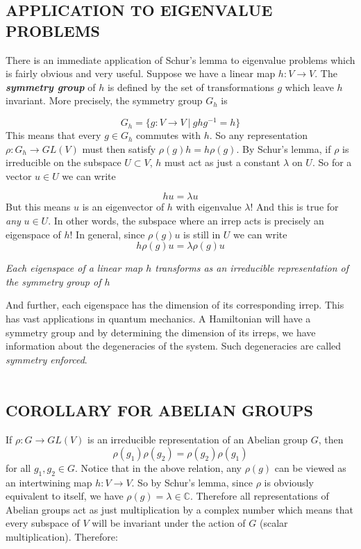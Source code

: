\documentclass[9 pt]{report}
\begin{document}
\newpage

{\centering
\subsection*{APPLICATION TO EIGENVALUE PROBLEMS}}
	There is an immediate application of Schur's lemma to eigenvalue problems which is fairly obvious and very useful. Suppose we have a linear map $h:V\to V$. The \textbf{\emph{symmetry group}} of $h$ is defined by the set of transformations $g$ which leave $h$ invariant. More precisely, the symmetry group $G_h$ is
	
	$$ G_h = \{ g:V\to V \:|\: ghg^{-1} = h \} $$
	This means that every $g\in G_h$ commutes with $h$. So any representation $\rho:G_h\to GL(V)$ must then satisfy $\rho(g)h = h\rho(g)$. By Schur's lemma, if $\rho$ is irreducible on the subspace $U\subset V$, $h$ must act as just a constant $\lambda$ on $U$. So for a vector $u\in U$ we can write
	
	$$ h u =  \lambda u $$
	But this means $u$ is an eigenvector of $h$ with eigenvalue $\lambda$! And this is true for \emph{any} $u\in U$. In other words, the subspace where an irrep acts is precisely an eigenspace of $h$! In general, since $\rho(g)u$ is still in $U$ we can write
	$$ h \rho(g)u = \lambda \rho(g)u $$
	\begin{tcolorbox}
	\emph{Each eigenspace of a linear map $h$ transforms as an irreducible representation of the symmetry group of $h$}
	\end{tcolorbox}
	And further, each eigenspace has the dimension of its corresponding irrep. This has vast applications in quantum mechanics. A Hamiltonian will have a symmetry group and by determining the dimension of its irreps, we have information about the degeneracies of the system. Such degeneracies are called \emph{symmetry enforced}.
\\
\\

{\centering
\subsection*{COROLLARY FOR ABELIAN GROUPS}}

If $\rho: G\rightarrow GL(V)$ is an irreducible representation of an Abelian group $G$, then 
$$ \rho(g_1)\rho(g_2)=\rho(g_2)\rho(g_1) $$
for all $g_1, g_2 \in G$. Notice that in the above relation, any $\rho(g)$ can be viewed as an intertwining map $h:V\rightarrow V$. So by Schur's lemma, since $\rho$ is obviously equivalent to itself, we have $\rho(g)=\lambda\in \mathbb{C} $. Therefore all representations of Abelian groups act as just multiplication by a complex number which means that every subspace of $V$ will be invariant under the action of $G$ (scalar multiplication). Therefore:
\end{document}

